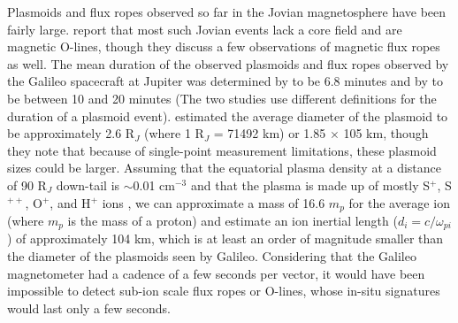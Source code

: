 Plasmoids and flux ropes observed so far in the Jovian magnetosphere have been fairly large.  report that most such Jovian events lack a core field and are magnetic O-lines, though they discuss a few observations of magnetic flux ropes as well. The mean duration of the observed plasmoids and flux ropes observed by the Galileo spacecraft at Jupiter was determined by  to be 6.8 minutes and by  to be between 10 and 20 minutes (The two studies use different definitions for the duration of a plasmoid event).  estimated the average diameter of the plasmoid to be approximately 2.6 R$_J$ (where 1 R$_J$ = 71492 km) or 1.85 $\times$ 105 km, though they note that because of single-point measurement limitations, these plasmoid sizes could be larger. Assuming that the equatorial plasma density at a distance of 90 R$_J$ down-tail is $\sim$0.01 cm$^{-3}$ \cite{Bagenal2011b} and that the plasma is made up of mostly S$^+$, S$^{++}$, O$^+$, and H$^+$ ions \cite{Kim2020SurveyObservations}, we can approximate a mass of 16.6 $m_p$ for the average ion (where $m_p$ is the mass of a proton) and estimate an ion inertial length ($d_i=c/\omega_{pi}$) of approximately 104 km, which is at least an order of magnitude smaller than the diameter of the plasmoids seen by Galileo. Considering that the Galileo magnetometer had a cadence of a few seconds per vector, it would have been impossible to detect sub-ion scale flux ropes or O-lines, whose in-situ signatures would last only a few seconds. 

